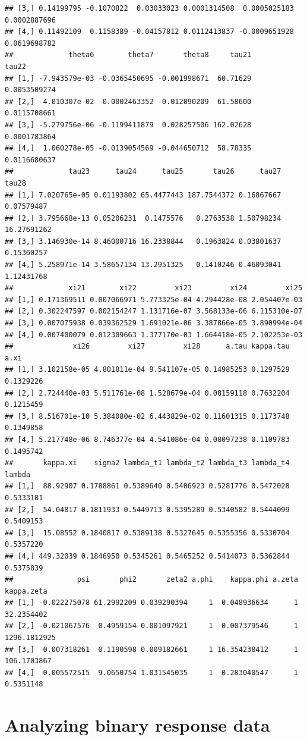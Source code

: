 \documentclass[a4paper, preprint, 3p,
authoryear]{elsarticle} %
\begin{document}
\begin{verbatim}
## [3,] 0.14199795 -0.1070822  0.03033023 0.0001314508  0.0005025183 0.0002887696
## [4,] 0.11492109  0.1158389 -0.04157812 0.0112413837 -0.0009651928 0.0619698782
##             theta6        theta7       theta8     tau21        tau22
## [1,] -7.943579e-03 -0.0365450695 -0.001998671  60.71629 0.0053509274
## [2,] -4.010307e-02  0.0002463352 -0.012090209  61.58600 0.0115708661
## [3,] -5.279756e-06 -0.1199411879  0.028257506 162.02628 0.0001783864
## [4,]  1.060278e-05 -0.0139054569 -0.044650712  58.78335 0.0116680637
##             tau23      tau24      tau25       tau26      tau27       tau28
## [1,] 7.020765e-05 0.01193802 65.4477443 187.7544372 0.16867667  0.07579487
## [2,] 3.795668e-13 0.05206231  0.1475576   0.2763538 1.50798234 16.27691262
## [3,] 3.146930e-14 8.46000716 16.2338844   0.1963824 0.03801637  0.15360257
## [4,] 5.258971e-14 3.58657134 13.2951325   0.1410246 0.46093041  1.12431768
##             xi21        xi22         xi23         xi24         xi25
## [1,] 0.171369511 0.007066971 5.773325e-04 4.294428e-08 2.054407e-03
## [2,] 0.302247597 0.002154247 1.131716e-07 3.568133e-06 6.115310e-07
## [3,] 0.007075938 0.039362529 1.691021e-06 3.387866e-05 3.890994e-04
## [4,] 0.007400079 0.012309663 1.377170e-03 1.664418e-05 2.102253e-03
##              xi26         xi27         xi28      a.tau kappa.tau      a.xi
## [1,] 3.102158e-05 4.801811e-04 9.541107e-05 0.14985253 0.1297529 0.1329226
## [2,] 2.724440e-03 5.511761e-08 1.528679e-04 0.08159118 0.7632204 0.1215459
## [3,] 8.516701e-10 5.384080e-02 6.443829e-02 0.11601315 0.1173748 0.1349858
## [4,] 5.217748e-06 8.746377e-04 4.541086e-04 0.08097238 0.1109783 0.1495742
##       kappa.xi    sigma2 lambda_t1 lambda_t2 lambda_t3 lambda_t4    lambda
## [1,]  88.92907 0.1788861 0.5389640 0.5406923 0.5281776 0.5472028 0.5333181
## [2,]  54.04817 0.1811933 0.5449713 0.5395289 0.5340582 0.5444099 0.5409153
## [3,]  15.08552 0.1840817 0.5389138 0.5327645 0.5355356 0.5330704 0.5357220
## [4,] 449.32039 0.1846950 0.5345261 0.5465252 0.5414073 0.5362844 0.5375839
##               psi       phi2       zeta2 a.phi    kappa.phi a.zeta   kappa.zeta
## [1,] -0.022275078 61.2992209 0.039290394     1  0.048936634      1   32.2354402
## [2,] -0.021067576  0.4959154 0.001097921     1  0.007379546      1 1296.1812925
## [3,]  0.007318261  0.1190598 0.009182661     1 16.354238412      1  106.1703867
## [4,]  0.005572515  9.0650754 1.031545035     1  0.283040547      1    0.5351148
\end{verbatim}

\section{Analyzing binary response
data}\label{analyzing-binary-response-data}
\end{document}
